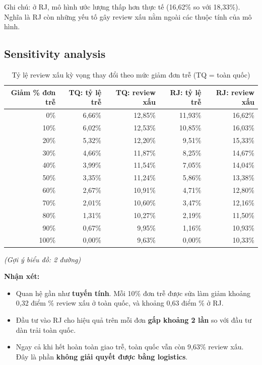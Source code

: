 \documentclass[12pt,a4paper]{report}
\newcommand{\bieudo}[1]{\par{\small\textit{(Gợi ý biểu đồ: #1)}}\par}
\renewcommand{\_}{\oldunderscore\allowbreak}
\begin{document}
Ghi chú: ở RJ, mô hình ước lượng thấp hơn thực tế (16,62\% so với 18,33\%). Nghĩa là RJ còn những yếu tố gây review xấu nằm ngoài các thuộc tính của mô hình.

\subsection{Sensitivity analysis}

\begin{table}[H]
\centering\small
\caption{Tỷ lệ review xấu kỳ vọng thay đổi theo mức giảm đơn trễ (TQ = toàn quốc)}
\begin{tabular}{rrrrr}
\toprule
Giảm \% đơn trễ & TQ: tỷ lệ trễ & TQ: review xấu & RJ: tỷ lệ trễ & RJ: review xấu \\
\midrule
0\% & 6,66\% & 12,85\% & 11,93\% & 16,62\% \\
10\% & 6,02\% & 12,53\% & 10,85\% & 16,03\% \\
20\% & 5,32\% & 12,20\% & 9,51\% & 15,33\% \\
30\% & 4,66\% & 11,87\% & 8,25\% & 14,67\% \\
40\% & 3,99\% & 11,54\% & 7,05\% & 14,04\% \\
50\% & 3,35\% & 11,24\% & 5,86\% & 13,38\% \\
60\% & 2,67\% & 10,91\% & 4,71\% & 12,80\% \\
70\% & 2,01\% & 10,60\% & 3,47\% & 12,16\% \\
80\% & 1,31\% & 10,27\% & 2,19\% & 11,50\% \\
90\% & 0,67\% & 9,95\% & 1,16\% & 10,93\% \\
100\% & 0,00\% & 9,63\% & 0,00\% & 10,33\% \\
\bottomrule
\end{tabular}
\end{table}
\bieudo{2 đường}

\textbf{Nhận xét:}
\begin{itemize}
\item Quan hệ gần như \textbf{tuyến tính}. Mỗi 10\% đơn trễ được sửa làm giảm khoảng 0,32 điểm \% review xấu ở toàn quốc, và khoảng 0,63 điểm \% ở RJ.
\item Đầu tư vào RJ cho hiệu quả trên mỗi đơn \textbf{gấp khoảng 2 lần} so với đầu tư dàn trải toàn quốc.
\item Ngay cả khi hết hoàn toàn giao trễ, toàn quốc vẫn còn 9,63\% review xấu. Đây là phần \textbf{không giải quyết được bằng logistics}.
\end{itemize}
\end{document}
